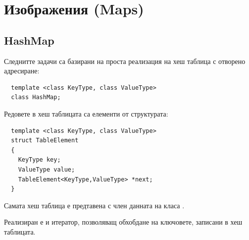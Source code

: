   \pagebreak

  \section {Изображения (Maps)}
  \subsection {HashMap}
  
  \begin{mdframed}[hidealllines=true,backgroundcolor=gray!20]
  Следнитте задачи са базирани на проста реализация на хеш таблица с отворено адресиране:
  \begin{verbatim}
  template <class KeyType, class ValueType>
  class HashMap;
  \end{verbatim}
  Редовете в хеш таблицата са елементи от структурата:
  \begin{verbatim}
  template <class KeyType, class ValueType>
  struct TableElement
  {
    KeyType key;
    ValueType value;
    TableElement<KeyType,ValueType> *next;
  }
  \end{verbatim}
  Самата хеш таблица е предтавена с член данната на класа  .

  Реализиран е и итератор, позволяващ обхобдане на ключовете, записани в хеш таблицата.

  \end{mdframed}
  
